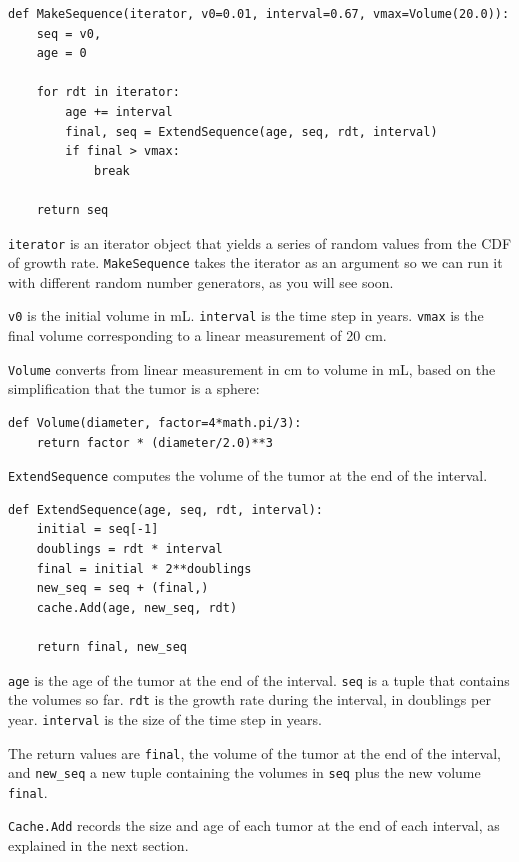 \documentclass[12pt]{book}
\begin{document}
\begin{verbatim}
def MakeSequence(iterator, v0=0.01, interval=0.67, vmax=Volume(20.0)):
    seq = v0,
    age = 0

    for rdt in iterator:
        age += interval
        final, seq = ExtendSequence(age, seq, rdt, interval)
        if final > vmax:
            break

    return seq
\end{verbatim}

{\tt iterator} is an iterator object that yields a series of
random values from the CDF of growth rate.  {\tt MakeSequence}
takes the iterator as an argument so we can run it with
different random number generators, as you will see soon.

{\tt v0} is the initial volume in mL.  {\tt interval} is the time step
in years.  {\tt vmax} is the final volume corresponding to a linear
measurement of 20 cm.

{\tt Volume} converts from linear measurement in cm to volume
in mL, based on the simplification that the tumor is a sphere:

\begin{verbatim}
def Volume(diameter, factor=4*math.pi/3):
    return factor * (diameter/2.0)**3
\end{verbatim}

{\tt ExtendSequence} computes the volume of the tumor at the
end of the interval.

\begin{verbatim}
def ExtendSequence(age, seq, rdt, interval):
    initial = seq[-1]
    doublings = rdt * interval
    final = initial * 2**doublings
    new_seq = seq + (final,)
    cache.Add(age, new_seq, rdt)
    
    return final, new_seq
\end{verbatim}

{\tt age} is the age of the tumor at the end of the interval.
{\tt seq} is a tuple that contains the volumes so far.  {\tt rdt} is
the growth rate during the interval, in doublings per year.
{\tt interval} is the size of the time step in years.

The return values are {\tt final}, the volume of the
tumor at the end of the interval, and \verb"new_seq" a new
tuple containing the volumes in {\tt seq} plus the new volume
{\tt final}.

{\tt Cache.Add} records the size and age of each tumor at the end
of each interval, as explained in the next section.
\end{document}
